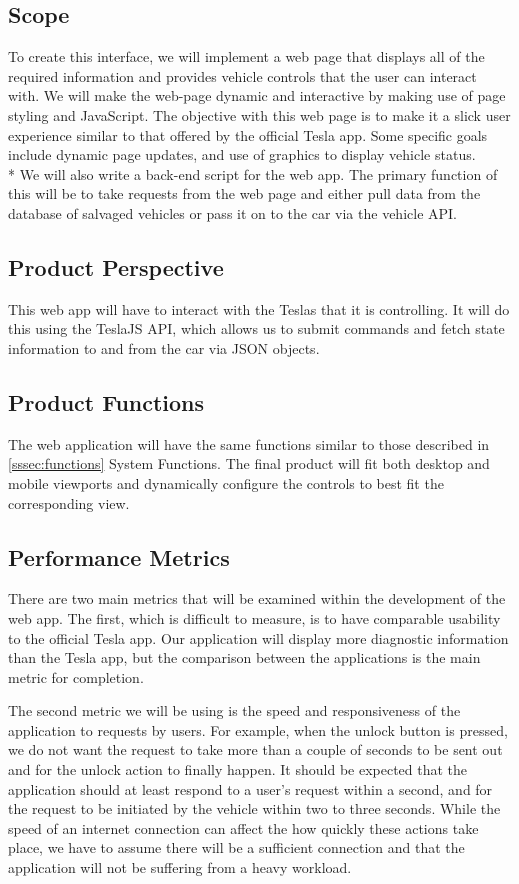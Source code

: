\documentclass[onecolumn, draftclsnofoot,10pt, compsoc]{IEEEtran}
\begin{document}
\subsection{Scope}
To create this interface, we will implement a web page that displays all of the required information and provides vehicle controls that the user can interact with. 
We will make the web-page dynamic and interactive by making use of page styling and JavaScript.
The objective with this web page is to make it a slick user experience similar to that offered by the official Tesla app. 
Some specific goals include dynamic page updates, and use of graphics to display vehicle status.\\*
We will also write a back-end script for the web app.
The primary function of this will be to take requests from the web page and either pull data from the database of salvaged vehicles or pass it on to the car via the vehicle API.

\subsection{Product Perspective}
This web app will have to interact with the Teslas that it is controlling. It will do this using the TeslaJS API, which allows us to submit commands and fetch state information to and from the car via JSON objects.

\subsection{Product Functions}
The web application will have the same functions similar to those described in \ref{sssec:functions} System Functions. The final product will fit both desktop and mobile viewports and dynamically configure the controls to best fit the corresponding view.

\subsection{Performance Metrics}

    There are two main metrics that will be examined within the development of the web app. 
    The first, which is difficult to measure, is to have comparable usability to the official Tesla app.
    Our application will display more diagnostic information than the Tesla app, but the comparison between the applications is the main metric for completion.
    
    The second metric we will be using is the speed and responsiveness of the application to requests by users.
    For example, when the unlock button is pressed, we do not want the request to take more than a couple of seconds to be sent out and for the unlock action to finally happen.
    It should be expected that the application should at least respond to a user's request within a second, and for the request to be initiated by the vehicle within two to three seconds.
    While the speed of an internet connection can affect the how quickly these actions take place, we have to assume there will be a sufficient connection and that the application will not be suffering from a heavy workload.
\end{document}
